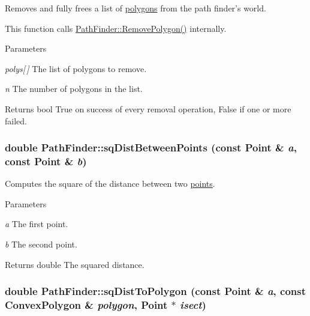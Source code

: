 Removes and fully frees a list of \hyperlink{structPathFinder_1_1ConvexPolygon}{polygons} from the path finder's world. 

This function calls \hyperlink{classPathFinder_adbc8795e40ef601769a2659c241b4cb9}{PathFinder::RemovePolygon()} internally.


\begin{DoxyParams}{Parameters}
\item[{\em polys\mbox{[}$\,$\mbox{]}}]The list of polygons to remove. \item[{\em n}]The number of polygons in the list. \end{DoxyParams}
\begin{DoxyReturn}{Returns}
bool True on success of every removal operation, False if one or more failed. 
\end{DoxyReturn}
\hypertarget{classPathFinder_a6757759823a710c8159d2d5f25912a62}{
\subsubsection[{sqDistBetweenPoints}]{\setlength{\rightskip}{0pt plus 5cm}double PathFinder::sqDistBetweenPoints (const {\bf Point} \& {\em a}, \/  const {\bf Point} \& {\em b})}}
\label{classPathFinder_a6757759823a710c8159d2d5f25912a62}


Computes the square of the distance between two \hyperlink{structPathFinder_1_1Point}{points}. 


\begin{DoxyParams}{Parameters}
\item[{\em a}]The first point. \item[{\em b}]The second point. \end{DoxyParams}
\begin{DoxyReturn}{Returns}
double The squared distance. 
\end{DoxyReturn}
\hypertarget{classPathFinder_a3589d5058e4a670c525379ae3474ddcc}{
\subsubsection[{sqDistToPolygon}]{\setlength{\rightskip}{0pt plus 5cm}double PathFinder::sqDistToPolygon (const {\bf Point} \& {\em a}, \/  const {\bf ConvexPolygon} \& {\em polygon}, \/  {\bf Point} $\ast$ {\em isect})}}
\label{classPathFinder_a3589d5058e4a670c525379ae3474ddcc}


